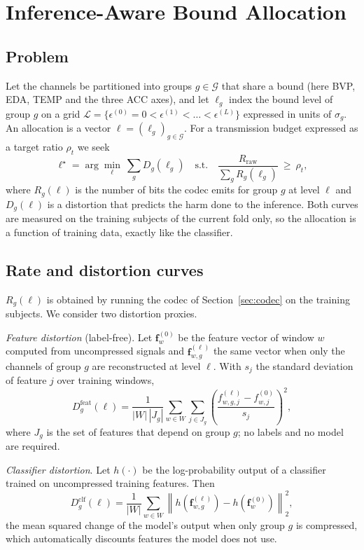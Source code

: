 \documentclass[journal]{IEEEtran}
\begin{document}
\section{Inference-Aware Bound Allocation}
\label{sec:alloc}
\subsection{Problem}
Let the channels be partitioned into groups $g\in\mathcal{G}$ that share a bound (here BVP, EDA, TEMP and the three ACC axes), and let $\ell_g$ index the bound level of group $g$ on a grid $\mathcal{L}=\{\epsilon^{(0)}=0<\epsilon^{(1)}<\dots<\epsilon^{(L)}\}$ expressed in units of $\sigma_g$. An allocation is a vector $\boldsymbol{\ell}=(\ell_g)_{g\in\mathcal{G}}$. For a transmission budget expressed as a target ratio $\rho_t$ we seek
\begin{equation}
\boldsymbol{\ell}^\star=\arg\min_{\boldsymbol{\ell}}\ \sum_{g} D_g(\ell_g)\quad\text{s.t.}\quad \frac{R_{\mathrm{raw}}}{\sum_g R_g(\ell_g)}\ \ge\ \rho_t,
\label{eq:alloc}
\end{equation}
where $R_g(\ell)$ is the number of bits the codec emits for group $g$ at level $\ell$ and $D_g(\ell)$ is a distortion that predicts the harm done to the inference. Both curves are measured on the training subjects of the current fold only, so the allocation is a function of training data, exactly like the classifier.

\subsection{Rate and distortion curves}
$R_g(\ell)$ is obtained by running the codec of Section~\ref{sec:codec} on the training subjects. We consider two distortion proxies.

\emph{Feature distortion} (label-free). Let $\mathbf{f}^{(0)}_w$ be the feature vector of window $w$ computed from uncompressed signals and $\mathbf{f}^{(\ell)}_{w,g}$ the same vector when only the channels of group $g$ are reconstructed at level $\ell$. With $s_j$ the standard deviation of feature $j$ over training windows,
\begin{equation}
D^{\mathrm{feat}}_g(\ell)=\frac{1}{|W|\,|J_g|}\sum_{w\in W}\sum_{j\in J_g}\left(\frac{f^{(\ell)}_{w,g,j}-f^{(0)}_{w,j}}{s_j}\right)^2,
\end{equation}
where $J_g$ is the set of features that depend on group $g$; no labels and no model are required.

\emph{Classifier distortion}. Let $h(\cdot)$ be the log-probability output of a classifier trained on uncompressed training features. Then
\begin{equation}
D^{\mathrm{clf}}_g(\ell)=\frac{1}{|W|}\sum_{w\in W}\left\|h(\mathbf{f}^{(\ell)}_{w,g})-h(\mathbf{f}^{(0)}_{w})\right\|_2^2 ,
\end{equation}
the mean squared change of the model's output when only group $g$ is compressed, which automatically discounts features the model does not use.
\end{document}
